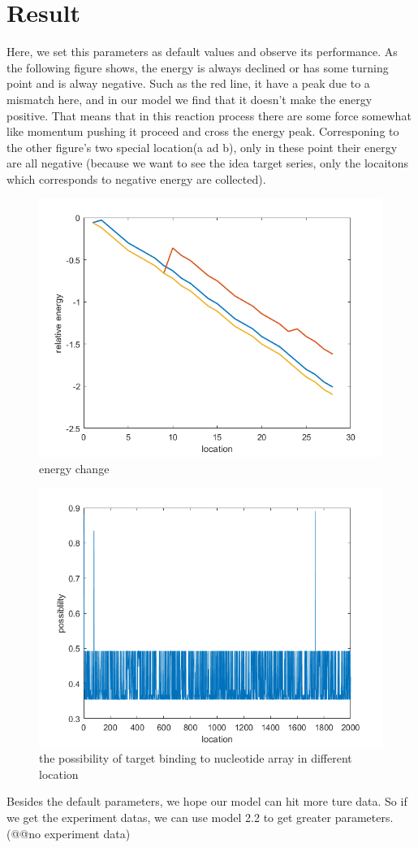 \documentclass[a4paper,10pt]{article}
\begin{document}
	\section{Result}
	Here, we set this parameters as default values and observe its performance. As the following figure shows, the energy is always declined or has some turning point and is alway negative. Such as the red line, it have a peak due to a mismatch here, and in our model we find that it doesn't make the energy positive. That means that in this reaction process there are some force somewhat like momentum pushing it proceed and cross the energy peak. Corresponing to the other figure's two special location(a ad b), only in these point their energy are all negative (because we want to see the idea target series, only the locaitons which corresponds to negative energy are collected).\par
	\begin{figure}[h]
		\centering
		\includegraphics[width=0.7\linewidth]{energy_change}
		\caption{energy change}
		\label{fig:energychange}
	\end{figure}
	\begin{figure}[h]
		\centering
		\includegraphics[width=0.7\linewidth]{fig1}
		\caption{the possibility of target binding to nucleotide array in different location}
		\label{fig:fig1}
	\end{figure}
	Besides the default parameters, we hope our model can hit more ture data. So if we get the experiment datas, we can use model 2.2 to get greater parameters.(@@no experiment data) 
		
	
	
	
\end{document}
